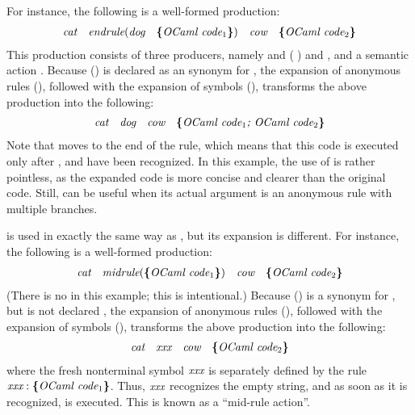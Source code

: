 \documentclass[onecolumn,11pt,nocopyrightspace,preprint]{sigplanconf}
\begin{document}
\newcommand{\AAA}{\nt{cat}}
\newcommand{\BBB}{\nt{dog}}
\newcommand{\CCC}{\nt{cow}}
\newcommand{\XXX}{\nt{xxx}}

For instance, the following is a well-formed production:
%
\[\begin{array}{l}
  \AAA \quad
  \nt{endrule}(\BBB \quad \dpaction{\nt{\ocaml code$_1$}}) \quad
  \CCC \quad
  \dpaction{\nt{\ocaml code$_2$}}
\end{array}\]
%
This production consists of three producers, namely
\AAA{} and
(\BBB$\;$) and
\CCC,
and a semantic action .
%
Because () is declared as an \dinline synonym for ,
the expansion of anonymous rules (), followed with the
expansion of \dinline symbols (), transforms the above
production into the following:
%
\[\begin{array}{l}
  \AAA \quad
  \BBB \quad
  \CCC \quad
  \dpaction{\nt{\ocaml code$_1$; \ocaml code$_2$}}
\end{array}\]
%
Note that  moves to the end of the rule, which means that
this code is executed only after \AAA, \BBB{} and \CCC{} have
been recognized. In this example, the use of  is rather pointless,
as the expanded code is more concise and clearer than the original code. Still,
 can be useful when its actual argument is an anonymous rule with
multiple branches.


 is used in exactly the same way as , but its expansion
is different. For instance, the following is a well-formed production:
%
\[\begin{array}{l}
  \AAA \quad
  \nt{midrule}(\dpaction{\nt{\ocaml code$_1$}}) \quad
  \CCC \quad
  \dpaction{\nt{\ocaml code$_2$}}
\end{array}\]
%
(There is no \BBB{} in this example; this is intentional.)
Because () is a synonym for , but is not declared
\dinline, the expansion of anonymous rules (), followed
with the expansion of \dinline symbols (), transforms the
above production into the following:
%
\[\begin{array}{l}
  \AAA \quad
  \XXX \quad
  \CCC \quad
  \dpaction{\nt{\ocaml code$_2$}}
\end{array}\]
%
where the fresh nonterminal symbol $\XXX$ is separately defined by the
rule $\XXX: \dpaction{\nt{\ocaml code$_1$}}$. Thus, $\XXX$ recognizes
the empty string, and as soon as it is recognized, 
is executed. This is known as a ``mid-rule action''.
\end{document}
